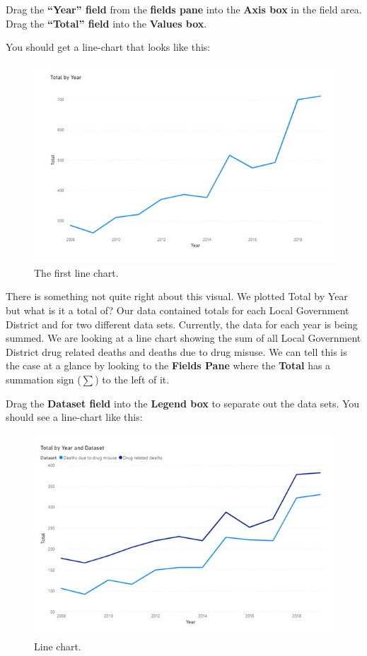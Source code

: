 \documentclass[
]{book}
\begin{document}
Drag the \textbf{``Year'' field} from the \textbf{fields pane} into the \textbf{Axis box} in the field area. Drag the \textbf{``Total'' field} into the \textbf{Values box}.

You should get a line-chart that looks like this:

\begin{figure}
\centering
\includegraphics{bi6.jpg}
\caption{The first line chart.}
\end{figure}

There is something not quite right about this visual. We plotted Total by Year but what is it a total of? Our data contained totals for each Local Government District and for two different data sets. Currently, the data for each year is being summed. We are looking at a line chart showing the sum of all Local Government District drug related deaths and deaths due to drug misuse. We can tell this is the case at a glance by looking to the \textbf{Fields Pane} where the \textbf{Total} has a summation sign (\(\sum\)) to the left of it.

Drag the \textbf{Dataset field} into the \textbf{Legend box} to separate out the data sets. You should see a line-chart like this:

\begin{figure}
\centering
\includegraphics{bi7.jpg}
\caption{Line chart.}
\end{figure}
\end{document}

